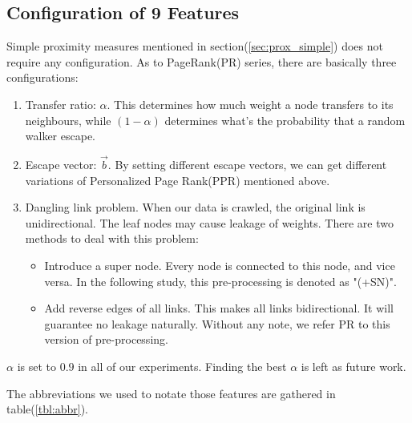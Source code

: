 \documentclass[11pt,a4paper]{article}
\begin{document}
\subsection{Configuration of 9 Features}

Simple proximity measures mentioned in section(\ref{sec:prox_simple}) 
does not require any configuration. As to PageRank(PR) series, 
there are basically three configurations:
\begin{enumerate}
	\item Transfer ratio: $\alpha$. This determines how much weight 
	a node transfers to its neighbours, while $(1-\alpha)$ determines 
	what's the probability that a random walker escape. 
	\item Escape vector: $\overrightarrow{b}$. By setting different 
	escape vectors, we can get different variations of Personalized 
	Page Rank(PPR) mentioned above. 
	\item Dangling link problem. When our data is crawled, the original
	link is unidirectional. The leaf nodes may cause leakage of weights. 
	There are two methods to deal with this problem:
		\begin{itemize}
			\item Introduce a super node. Every node is connected to this 
			node, and vice versa. In the following study, this 
			pre-processing is denoted as "(+SN)". 
			\item Add reverse edges of all links. This makes all links
			bidirectional. It will guarantee
			no leakage naturally. Without any note, we refer PR to 
			this version of pre-processing.  
		\end{itemize}
\end{enumerate}

$\alpha$ is set to $0.9$ in all of our experiments. 
Finding the best $\alpha$ is left as future work. 

The abbreviations we used to notate those features 
are gathered in table(\ref{tbl:abbr}). 
\end{document}
